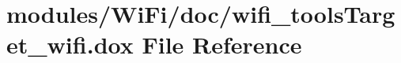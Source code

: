 \hypertarget{wifi__tools_target__wifi_8dox}{}\section{modules/\+Wi\+Fi/doc/wifi\+\_\+tools\+Target\+\_\+wifi.dox File Reference}
\label{wifi__tools_target__wifi_8dox}
